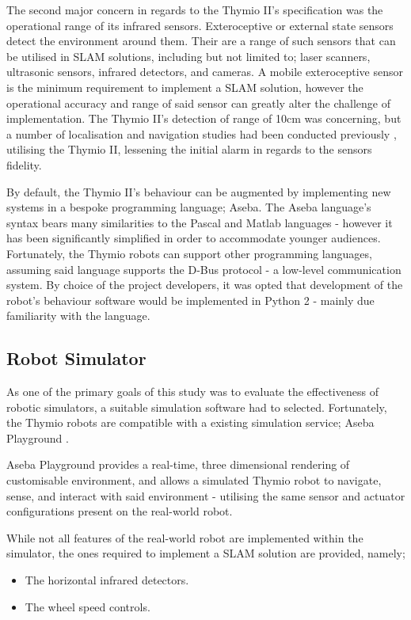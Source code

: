 The second major concern in regards to the Thymio II's specification was the
operational range of its infrared sensors.
Exteroceptive or external state sensors detect the environment around
them.
Their are a range of such sensors that can be utilised in SLAM solutions,
including but not limited to; laser scanners, ultrasonic sensors, infrared
detectors, and cameras.
A mobile exteroceptive sensor is the minimum requirement to implement a SLAM
solution, however the operational accuracy and range of said sensor can
greatly alter the challenge of implementation.
The Thymio II's detection of range of 10cm was concerning, but a number of
localisation and navigation studies had been conducted previously
\cite{Wang2016}, utilising the Thymio II, lessening the initial alarm in
regards to the sensors fidelity.

By default, the Thymio II's behaviour can be augmented by implementing
new systems in a bespoke programming language; Aseba.
The Aseba language's syntax bears many similarities to the Pascal and
Matlab languages - however it has been significantly simplified in order to
accommodate younger audiences.
Fortunately, the Thymio robots can support other programming languages,
assuming said language supports the D-Bus protocol - a low-level communication
system.
By choice of the project developers, it was opted that development of the
robot's behaviour software would be implemented in Python 2 - mainly due
familiarity with the language.

\subsection{Robot Simulator}
As one of the primary goals of this study was to evaluate the effectiveness of
robotic simulators, a suitable simulation software had to selected.
Fortunately, the Thymio robots are compatible with a existing simulation
service; Aseba Playground \cite{aseba-community}.

Aseba Playground provides a real-time, three dimensional rendering of
customisable environment, and allows a simulated Thymio robot to navigate,
sense, and interact with said environment - utilising the same sensor and
actuator configurations present on the real-world robot.

While not all features of the real-world robot are implemented within the
simulator, the ones required to implement a SLAM solution are provided, namely;

\begin{itemize}
\item The horizontal infrared detectors.
\item The wheel speed controls.
\end{itemize}

